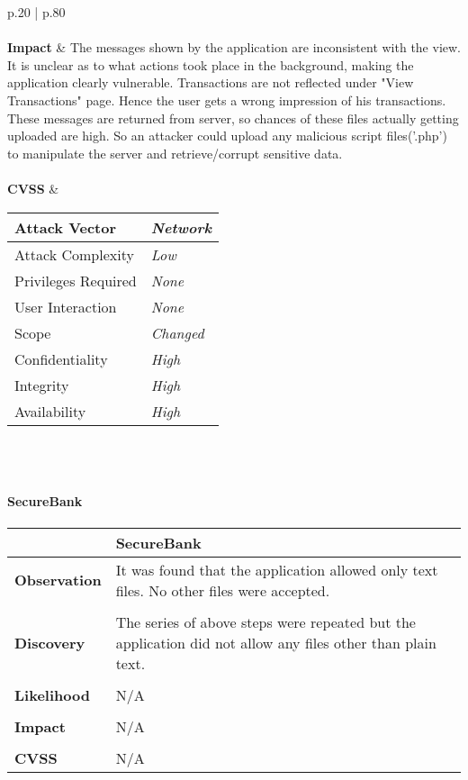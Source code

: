 \begin{longtable*}{p{.20\textwidth} | p{.80\textwidth}}
    \\\\
    \textbf{Impact} &
        The messages shown by the application are inconsistent with the view. It is unclear as to what actions took place in the background, making the application clearly vulnerable. Transactions are not reflected under "View Transactions" page. Hence the user gets a wrong impression of his transactions. These messages are returned from server, so chances of these files actually getting uploaded are high. So an attacker could upload any malicious script files('.php') to manipulate the server and retrieve/corrupt sensitive data.
    \\\\
    \textbf{CVSS} &
       \begin{tabular}{| l | l |}
             \hline
             Attack Vector		& \textit{Network}\\
             \hline
             Attack Complexity	& \textit{Low} \\
             \hline
             Privileges Required & \textit{None} \\
             \hline
             User Interaction	& \textit{None} \\
             \hline
             Scope		& \textit{Changed} \\
             \hline
             Confidentiality	& \textit{High} \\
             \hline
             Integrity		& \textit{High} \\
             \hline
             Availability		& \textit{High} \\
             \hline
             \end{tabular}
           \\
    \\
    \hline
\end{longtable*}
\paragraph{SecureBank} \mbox{}
\begin{longtable*}{p{.20\textwidth} | p{.80\textwidth}}
    \hline
    & \textbf{SecureBank} \\
    \hline
    \textbf{Observation} &
        It was found that the application allowed only text files. No other files were accepted.
    \\\\
    \textbf{Discovery} &
	    The series of above steps were repeated but the application did not allow any files other than plain text.
    \\\\
    \textbf{Likelihood} &
        N/A
    \\\\
    \textbf{Impact} &
		N/A
    \\\\
    \textbf{CVSS} &
        N/A
    \\
    \hline
\end{longtable*}
\clearpage
